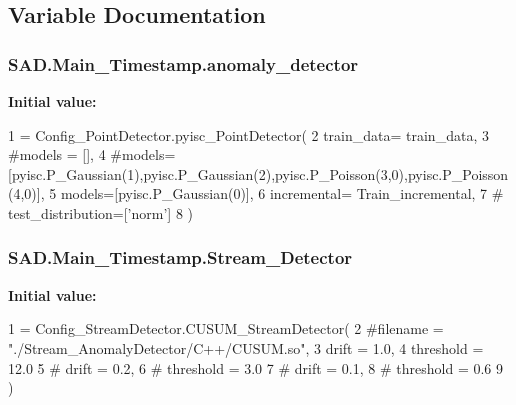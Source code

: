 \subsection{Variable Documentation}
\subsubsection[{\texorpdfstring{anomaly\+\_\+detector}{anomaly_detector}}]{\setlength{\rightskip}{0pt plus 5cm}S\+A\+D.\+Main\+\_\+\+Timestamp.\+anomaly\+\_\+detector}\hypertarget{namespaceSAD_1_1Main__Timestamp_a5c21961c6ce071c8210d5d0bc8863e4e}{}\label{namespaceSAD_1_1Main__Timestamp_a5c21961c6ce071c8210d5d0bc8863e4e}
{\bfseries Initial value\+:}
\begin{DoxyCode}
1 = Config\_PointDetector.pyisc\_PointDetector(
2     train\_data= train\_data,
3     \textcolor{comment}{#models = [],}
4     \textcolor{comment}{#models=[pyisc.P\_Gaussian(1),pyisc.P\_Gaussian(2),pyisc.P\_Poisson(3,0),pyisc.P\_Poisson(4,0)],}
5     models=[pyisc.P\_Gaussian(0)],
6     incremental= Train\_incremental,
7     \textcolor{comment}{# test\_distribution=['norm']}
8 )
\end{DoxyCode}
\subsubsection[{\texorpdfstring{Stream\+\_\+\+Detector}{Stream_Detector}}]{\setlength{\rightskip}{0pt plus 5cm}S\+A\+D.\+Main\+\_\+\+Timestamp.\+Stream\+\_\+\+Detector}\hypertarget{namespaceSAD_1_1Main__Timestamp_a1ad8864da27da3d528350575f27d8d94}{}\label{namespaceSAD_1_1Main__Timestamp_a1ad8864da27da3d528350575f27d8d94}
{\bfseries Initial value\+:}
\begin{DoxyCode}
1 = Config\_StreamDetector.CUSUM\_StreamDetector(
2     \textcolor{comment}{#filename = "./Stream\_AnomalyDetector/C++/CUSUM.so",}
3     drift = 1.0,
4     threshold = 12.0
5     \textcolor{comment}{# drift = 0.2,}
6     \textcolor{comment}{# threshold = 3.0}
7     \textcolor{comment}{# drift = 0.1,}
8     \textcolor{comment}{# threshold = 0.6}
9 )
\end{DoxyCode}
